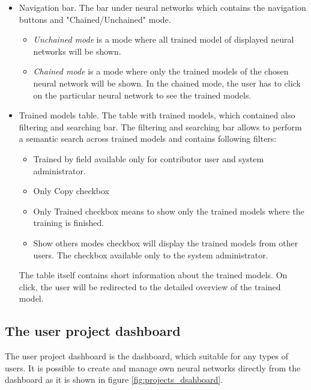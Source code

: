 \begin{itemize}
\item{Navigation bar.} The bar under neural networks which contains the navigation buttons and "Chained/Unchained" mode.
\begin{itemize}
\item \emph{Unchained mode} is a mode where all trained model of displayed neural networks will be shown.
\item \emph{Chained mode} is a mode where only the trained models of the chosen neural network will be shown. In the chained mode, the user has to click on the particular neural network to see the trained models. 
\end{itemize}

\item{Trained models table.} The table with trained models, which contained also filtering and searching bar.
The filtering and searching bar allows to perform a semantic search across trained models and contains following filters:
\begin{itemize}
\item Trained by field available only for contributor user and system administrator.
\item Only Copy checkbox
\item Only Trained checkbox means to show only the trained models where the training is finished.
\item Show others modes checkbox will display the trained models from other users. The checkbox available only to the system administrator.
\end{itemize}

The table itself contains short information about the trained models. On click, the user will be redirected to the detailed overview of the trained model.

\end{itemize}

\subsection{The user project dashboard}\label{The user projects dashboard}
The user project dashboard is the dashboard, which suitable for any types of users. It is possible to create and manage own neural networks directly from the dashboard as it is shown in figure \ref{fig:projects_dsahboard}.

